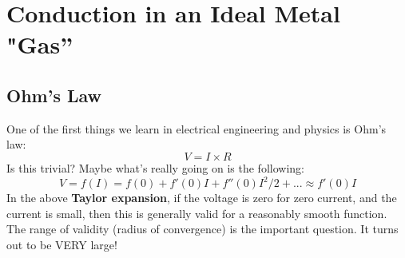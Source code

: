 \section{Conduction in an Ideal Metal "Gas''}
\subsection{Ohm’s Law}
One of the first things we learn in electrical engineering and physics is Ohm's law:
    \begin{equation}
        V = I \times R
        \label{eq:ohms}
    \end{equation}
Is this trivial? Maybe what's really going on is the following:
    \begin{equation}
        V = f(I) = f(0) + f'(0)I + f''(0){I^2}/2 + ... \approx f'(0)I
        \label{eq:taylor_ohms}
    \end{equation}
In the above \textbf{Taylor expansion}, if the voltage is zero for zero current, and the current is small, then this is generally valid for a reasonably smooth function.   The range of validity (radius of convergence) is the important question. It turns out to be VERY large!
